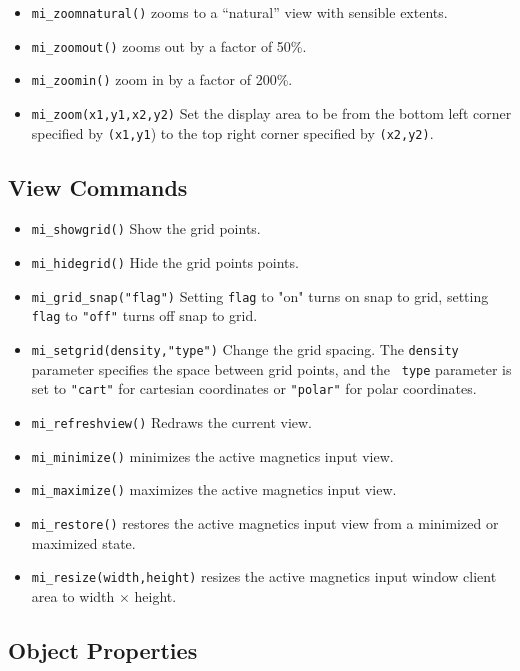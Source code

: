 \begin{itemize}
\item{\tt mi\_zoomnatural()} zooms to a ``natural'' view with sensible extents.
\item{\tt mi\_zoomout()} zooms out by a factor of 50\%.
\item{\tt mi\_zoomin()} zoom in by a factor of 200\%.
\item{\tt mi\_zoom(x1,y1,x2,y2)}
Set the display area to be from the bottom left corner specified by
{\tt (x1,y1}) to the top right corner specified by {\tt (x2,y2)}.
\end{itemize}

\subsection{View Commands}

\begin{itemize}
\item{\verb+mi_showgrid()+} Show the grid points.
\item{\verb+mi_hidegrid()+} Hide the grid points points.
\item{\verb+mi_grid_snap("flag")+}
Setting {\tt flag} to "on" turns on snap to grid, setting {\tt
flag} to {\tt "off"} turns off snap to grid.
\item{\verb+mi_setgrid(density,"type")+} Change the grid spacing.  The {\tt density}
parameter specifies the space between grid points, and the {\tt
type} parameter is set to {\tt "cart"} for cartesian coordinates or
{\tt "polar"} for polar coordinates.
\item{\tt mi\_refreshview()} Redraws the current view.
\item{\tt mi\_minimize()} minimizes the active magnetics input view.
\item{\tt mi\_maximize()} maximizes the active magnetics input view.
\item{\tt mi\_restore()} restores the active magnetics input view from a
 minimized or maximized state.
\item{\tt mi\_resize(width,height)} resizes the active magnetics input
 window client area to width $\times$ height.
\end{itemize}

\subsection{Object Properties}

